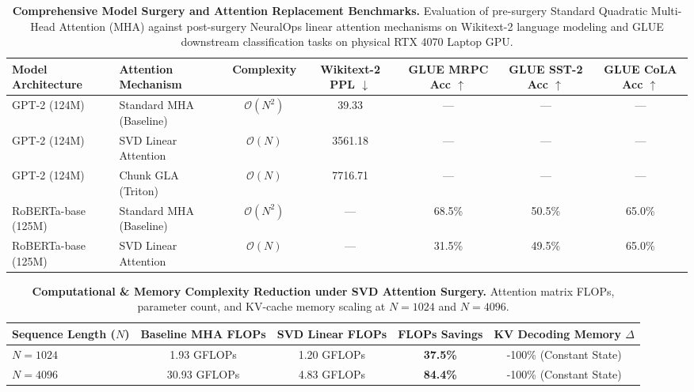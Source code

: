 
\begin{table}[t]
\centering
\small
\caption{\textbf{Comprehensive Model Surgery and Attention Replacement Benchmarks.} Evaluation of pre-surgery Standard Quadratic Multi-Head Attention (MHA) against post-surgery NeuralOps linear attention mechanisms on Wikitext-2 language modeling and GLUE downstream classification tasks on physical RTX 4070 Laptop GPU.}
\label{tab:model_surgery_benchmarks}
\begin{tabular}{llccccc}
\toprule
\textbf{Model Architecture} & \textbf{Attention Mechanism} & \textbf{Complexity} & \textbf{Wikitext-2 PPL} $\downarrow$ & \textbf{GLUE MRPC Acc} $\uparrow$ & \textbf{GLUE SST-2 Acc} $\uparrow$ & \textbf{GLUE CoLA Acc} $\uparrow$ \\
\midrule
GPT-2 (124M) & Standard MHA (Baseline) & $\mathcal{O}(N^2)$ & 39.33 & --- & --- & --- \\
GPT-2 (124M) & SVD Linear Attention & $\mathcal{O}(N)$ & 3561.18 & --- & --- & --- \\
GPT-2 (124M) & Chunk GLA (Triton) & $\mathcal{O}(N)$ & 7716.71 & --- & --- & --- \\
\midrule
RoBERTa-base (125M) & Standard MHA (Baseline) & $\mathcal{O}(N^2)$ & --- & 68.5\% & 50.5\% & 65.0\% \\
RoBERTa-base (125M) & SVD Linear Attention & $\mathcal{O}(N)$ & --- & 31.5\% & 49.5\% & 65.0\% \\
\bottomrule
\end{tabular}
\end{table}

\begin{table}[h]
\centering
\small
\caption{\textbf{Computational \& Memory Complexity Reduction under SVD Attention Surgery.} Attention matrix FLOPs, parameter count, and KV-cache memory scaling at $N=1024$ and $N=4096$.}
\label{tab:complexity_reduction}
\begin{tabular}{lcccc}
\toprule
\textbf{Sequence Length ($N$)} & \textbf{Baseline MHA FLOPs} & \textbf{SVD Linear FLOPs} & \textbf{FLOPs Savings} & \textbf{KV Decoding Memory $\Delta$} \\
\midrule
$N=1024$ & 1.93 GFLOPs & 1.20 GFLOPs & \textbf{37.5\%} & -100\% (Constant State) \\
$N=4096$ & 30.93 GFLOPs & 4.83 GFLOPs & \textbf{84.4\%} & -100\% (Constant State) \\
\bottomrule
\end{tabular}
\end{table}

